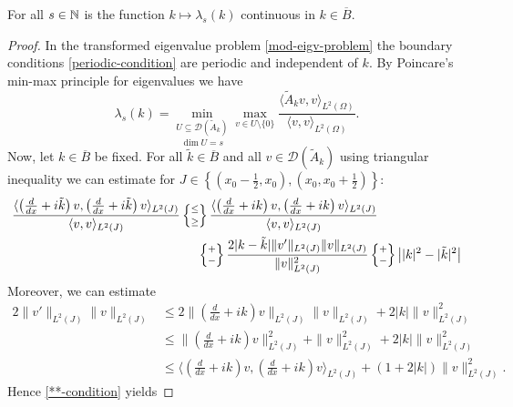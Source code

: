 \begin{theorem} \label{6.1}
	For all $s \in \mathbb{N}$ is the function $k \mapsto \lambda_{s}(k)$ continuous in $k \in \overline{B}$.
	\begin{proof}
		In the transformed eigenvalue problem \eqref{mod-eigv-problem} the boundary conditions \eqref{periodic-condition} are periodic and independent of $k$. By Poincare's min-max principle for eigenvalues we have
		\begin{equation}
			\lambda_{s}(k) = \underset{\dim U = s}{\min_{U \subseteq \mathcal{D}(\tilde{A}_{k})}} \max_{v \in U \setminus \{ 0 \} } \frac{\langle \tilde{A}_{k} v, v \rangle_{L^{2}(\Omega)}}{\langle v, v \rangle_{L^{2}(\Omega)}}.  \label{poincare} 
		\end{equation} 
		Now, let $k \in \overline{B}$ be fixed. For all $\tilde{k} \in \overline{B}$ and all $v \in \mathcal{D}(\tilde{A}_{k})$ using triangular inequality we can estimate for $J \in \left\{ (x_{0} - \frac{1}{2}, x_{0}), (x_{0}, x_{0} + \frac{1}{2}) \right\}$:
		\begin{align}
			 \frac{ \langle \left( \frac{d}{dx} + i\tilde{k} \right) v , \left( \frac{d}{dx} + i\tilde{k} \right) v \rangle_{L^{2}(J)}}{\langle v , v \rangle_{L^{2}(J)}} & \left\{\mathrel{\substack{\leq \\[0.1cm] \geq}}\right\} \frac{ \langle \left( \frac{d}{dx} + ik \right) v , \left( \frac{d}{dx} + ik \right) v \rangle_{L^{2}(J)}}{\langle v , v \rangle_{L^{2}(J)}} \notag \\
			& ~\quad \left\{\mathrel{\substack{+ \\[0.1cm] -}}\right\} \frac{2 |k-\tilde{k}|\|v'\|_{L^{2}(J)} \| v \|_{L^{2}(J)}}{\| v \|^{2}_{L^{2}(J)}} \left\{\mathrel{\substack{+ \\[0.1cm] -}}\right\} \left| |k|^{2} - |\tilde{k}|^{2} \right| \label{**-condition}
		\end{align}
		Moreover, we can estimate
		\begin{align*}
			2 \| v' \|_{L^{2}(J)} \| v \|_{L^{2}(J)} & \leq 2 \| \left( \frac{d}{dx} + ik \right) v\|_{L^{2}(J)} \| v \|_{L^{2}(J)} + 2|k| \|v\|^{2}_{L^{2}(J)} \\
			& \leq \| \left( \frac{d}{dx} + ik \right) v \|^{2}_{L^{2}(J)} + \| v \|^{2}_{L^{2}(J)} + 2 |k| \| v \|^{2}_{L^{2}(J)} \\
			& \leq \langle  \left( \frac{d}{dx} + ik \right) v,  \left( \frac{d}{dx} + ik \right) v \rangle_{L^{2}(J)} + (1 + 2|k|) \|v\|^{2}_{L^{2}(J)}.
		\end{align*}
		Hence \eqref{**-condition} yields

\end{proof}
\end{theorem}
